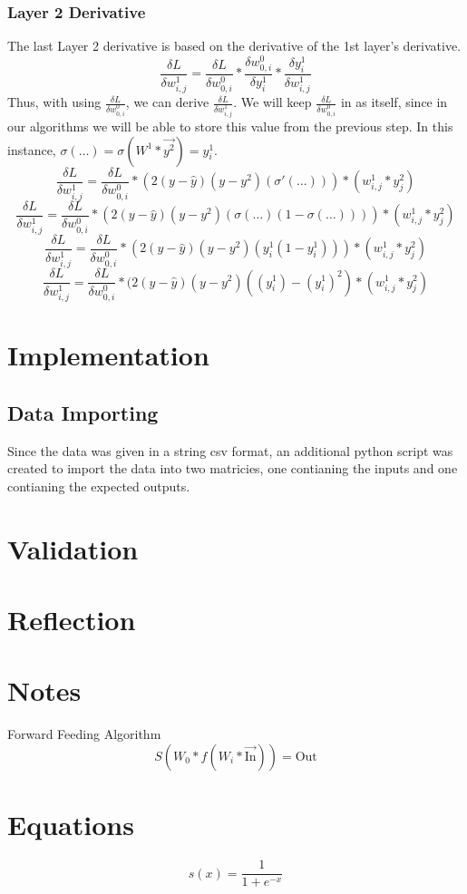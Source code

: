 \documentclass[10pt]{article}
\begin{document}
\subsubsection{Layer 2 Derivative}
The last Layer 2 derivative is based on the derivative of the 1st layer's derivative.
$$\frac{\delta L}{\delta w^1_{i,j}} = \frac{\delta L}{\delta w^0_{0,i}} * \frac{\delta w^0_{0,i}}{\delta y^1_i} * \frac{\delta y^1_i}{\delta w^1_{i,j}}$$
Thus, with using $\frac{\delta L}{\delta w^0_{0,i}}$, we can derive $\frac{\delta L}{\delta w^1_{i,j}}$. We will keep $\frac{\delta L}{\delta w^0_{0,i}}$ in as itself, since in our algorithms we will be able to store this value from the previous step. In this instance, $\sigma(\ldots) = \sigma(W^1 * \vec{y^2}) = y^1_i$.
$$\frac{\delta L}{\delta w^1_{i,j}} = \frac{\delta L}{\delta w^0_{0,i}} * (2(y-\hat{y})(y - y^2)(\sigma'(\ldots))) * (w^1_{i,j} * y^2_{j})$$
$$\frac{\delta L}{\delta w^1_{i,j}} = \frac{\delta L}{\delta w^0_{0,i} }* (2(y - \hat{y})(y - y^2)(\sigma(\ldots)(1 - \sigma(\ldots)))) * (w^1_{i,j} * y^2_{j})$$
$$\frac{\delta L}{\delta w^1_{i,j}} = \frac{\delta L}{\delta w^0_{0,i}} * (2(y - \hat{y})(y - y^2)(y^1_i (1 - y^1_i))) * (w^1_{i,j} * y^2_{j})$$
$$\frac{\delta L}{\delta w^1_{i,j}} = \frac{\delta L}{\delta w^0_{0,i}} * (2(y - \hat{y})(y - y^2)((y^1_i) - (y^1_i)^2) * (w^1_{i,j} * y^2_{j})$$


\section{Implementation}
\subsection{Data Importing}
Since the data was given in a string csv format, an additional python script was created to import the data into two matricies, one contianing the inputs and one contianing the expected outputs.
\section{Validation}
\section{Reflection}

\section{Notes}
Forward Feeding Algorithm
$$S(W_0 * f(W_i * \vec{\text{In}})) = \text{Out}$$

\section{Equations}
$$s(x) = \frac{1}{1 + e^{-x}}$$


\end{document}
